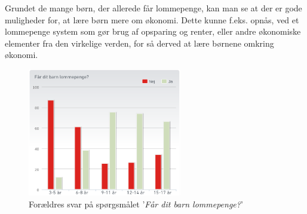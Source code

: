 Grundet de mange børn, der allerede får lommepenge, kan man se at der er gode muligheder for, at lære børn mere om økonomi. Dette kunne f.eks. opnås, ved et lommepenge system som gør brug af opsparing og renter, eller andre økonomiske elementer fra den virkelige verden, for så derved at lære børnene omkring økonomi.
\begin{figure}[htb]
\centering
\includegraphics[width=0.6\textwidth]{Billeder/FaarBarnLommepenge.png}
\caption{Forældres svar på spørgsmålet '\textit{Får dit barn lommepenge?}'}
\label{FaarBarnLommepenge}
\end{figure}
